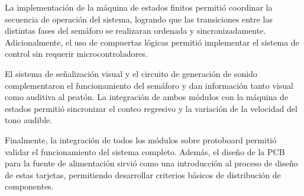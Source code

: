 \documentclass[12pt, journal, onecolumn]{IEEEtran}
\begin{document}
La implementación de la máquina de estados finitos permitió coordinar la secuencia de operación del sistema, logrando que las transiciones entre las distintas fases del semáforo se realizaran ordenada y sincronizadamente. Adicionalmente, el uso de compuertas lógicas permitió implementar el sistema de control sin requerir microcontroladores.

El sistema de señalización visual y el circuito de generación de sonido complementaron el funcionamiento del semáforo y dan información tanto visual como auditiva al peatón. La integración de ambos módulos con la máquina de estados permitió sincronizar el conteo regresivo y la variación de la velocidad del tono audible.

Finalmente, la integración de todos los módulos sobre protoboard permitió validar el funcionamiento del sistema completo. Además, el diseño de la PCB para la fuente de alimentación sirvió como una introducción al proceso de diseño de estas tarjetas, permitiendo desarrollar criterios básicos de distribución de componentes.
	
\end{document}
